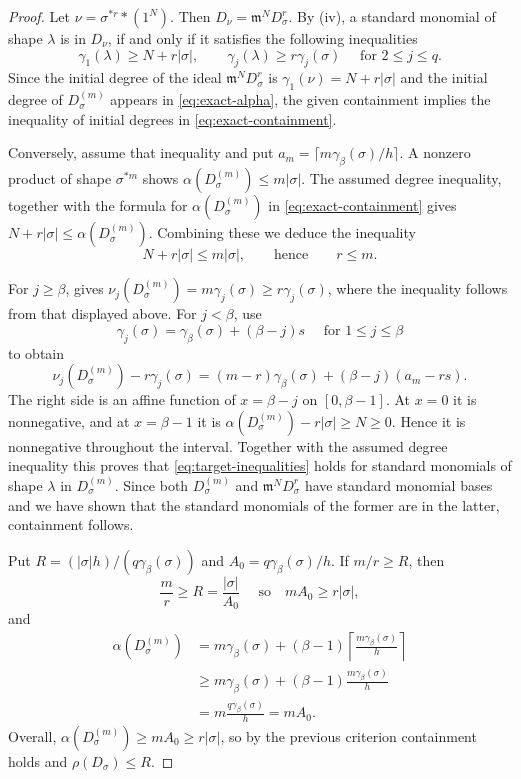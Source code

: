 \documentclass[11pt,reqno]{amsart}
\numberwithin{equation}{subsection}
\theoremstyle{definition}
\theoremstyle{remark}
\newcommand{\fm}{\mathfrak m}
\renewcommand{\l}{\lambda}
\begin{document}
\begin{proof}
Let $\nu=\sigma^{*r}*(1^N)$. Then $D_\nu=\fm^N D_\sigma^r$.
By (iv), a standard monomial of shape $\l$ is in $D_\nu$, if and only if it  satisfies the following inequalities
\begin{equation}\label{eq:target-inequalities}
 \gamma_1(\lambda)\ge N+r|\sigma|,\qquad
 \gamma_j(\lambda)\ge r\gamma_j(\sigma)\quad \text{ for } 2\le j\le q.
\end{equation}
Since the initial degree of the ideal $\fm^N D_\sigma^r$ is $\gamma_1(\nu)=N+r|\sigma|$ and the initial degree of $D_\sigma^{(m)}$ appears in \eqref{eq:exact-alpha},  the given containment implies the
inequality of initial degrees  in \eqref{eq:exact-containment}.

Conversely, assume that inequality and put $a_m=\lceil m\gamma_\beta(\sigma)/h\rceil$.
A nonzero product of shape $\sigma^{*m}$ shows
$\alpha(D_\sigma^{(m)})\le m|\sigma|$. The assumed degree inequality, together with the formula for \(\alpha(D_\sigma^{(m)})\) in \eqref{eq:exact-containment} gives 
$N+r|\sigma| \le \alpha(D_\sigma^{(m)})$. Combining these we deduce the inequality
\[
N+r|\sigma| \le m|\sigma|, \qquad \text{hence} \qquad r\le m.
\]

For $j\ge\beta$,
 gives
$\nu_j(D_\sigma^{(m)})=m\gamma_j(\sigma)\ge r\gamma_j(\sigma)$, where the inequality follows from that displayed above.
For $j<\beta$, use 
\[
\gamma_j(\sigma)=\gamma_\beta(\sigma)+(\beta-j)s\quad \text{ for }1\le j\le\beta
\]
 to obtain
\[
 \nu_j(D_\sigma^{(m)})-r\gamma_j(\sigma)
 =(m-r)\gamma_\beta(\sigma)+(\beta-j)(a_m-rs).
\]
The right side is an affine function of $x=\beta-j$ on
$[0,\beta-1]$. At $x=0$ it is nonnegative, and at $x=\beta-1$ it is
$\alpha(D_\sigma^{(m)})-r|\sigma|\ge N\ge0$. Hence it is nonnegative
throughout the interval. %
Together with the assumed degree inequality this proves that
\eqref{eq:target-inequalities} holds for standard monomials of shape $\l$ in $D_\sigma^{(m)}$. Since both $D_\sigma^{(m)}$ and  $\fm^N D_\sigma^r$ have standard monomial bases and we have shown that the standard monomials of the former are in the latter, containment follows.

Put $R=(|\sigma|h)/(q\gamma_\beta(\sigma))$ and $A_0=q\gamma_\beta(\sigma)/h$. If $m/r\ge R$, then
\[
\frac mr\ge R=\frac{|\sigma|}{A_0}
\quad\text{ so}\quad
mA_0\ge r|\sigma|,
\]
and
\[
\begin{aligned}
\alpha(D_\sigma^{(m)})
&=m\gamma_\beta(\sigma)
 +(\beta-1)\left\lceil\frac{m\gamma_\beta(\sigma)}h\right\rceil\\
&\ge m\gamma_\beta(\sigma)
 +(\beta-1)\frac{m\gamma_\beta(\sigma)}h\\
&=m\frac{q\gamma_\beta(\sigma)}h
=mA_0.
\end{aligned}
\]
Overall, $\alpha(D_\sigma^{(m)})\ge mA_0\ge r|\sigma|$, so by the previous criterion containment holds and
$\rho(D_\sigma)\le R$. 


\end{proof}
\end{document}
